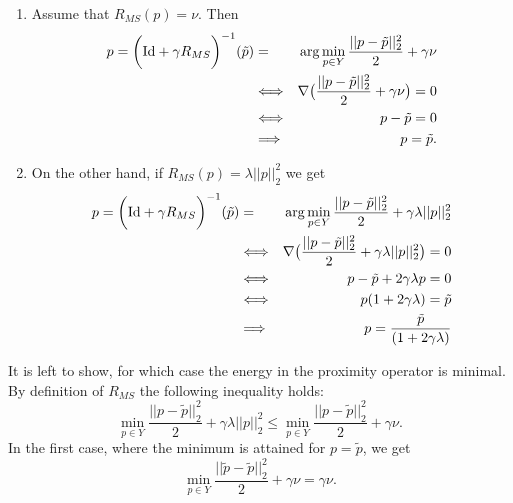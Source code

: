         \begin{enumerate}
            \item Assume that $R_{MS}(p) = \nu$. Then
                \begin{eqnarray}
                    p = \bigg( \textnormal{Id} + \gamma R_{MS} \bigg)^{-1}(\tilde{p}) &=& \arg \min_{p \in Y} \frac{||p - \tilde{p}||_{2}^{2}}{2} + \gamma\nu \notag \\
                    &\Longleftrightarrow& \nabla \big( \frac{||p - \tilde{p}||_{2}^{2}}{2} + \gamma\nu \big) = 0 \notag \\
                    &\Longleftrightarrow& p - \tilde{p} = 0 \notag \\
                    &\Longrightarrow& p = \tilde{p}. \notag
                \end{eqnarray}
            \item On the other hand, if $R_{MS}(p) = \lambda ||p||_{2}^{2}$ we get
                \begin{eqnarray}
                    p = \bigg( \textnormal{Id} + \gamma R_{MS} \bigg)^{-1}(\tilde{p}) &=& \arg \min_{p \in Y} \frac{||p - \tilde{p}||_{2}^{2}}{2} + \gamma \lambda ||p||_{2}^{2} \notag \\
                    &\Longleftrightarrow& \nabla \big( \frac{||p - \tilde{p}||_{2}^{2}}{2} + \gamma \lambda ||p||_{2}^{2} \big) = 0 \notag \\
                    &\Longleftrightarrow& p - \tilde{p} + 2 \gamma \lambda p = 0 \notag \\
                    &\Longleftrightarrow& p (1 + 2\gamma \lambda) = \tilde{p} \notag \\
                    &\Longrightarrow& p = \frac{\tilde{p}}{(1 + 2\gamma \lambda)} \notag
                \end{eqnarray}
        \end{enumerate}
        It is left to show, for which case the energy in the proximity operator is minimal. By definition of  $R_{MS}$ the following inequality holds:
            \begin{equation}
                \min_{p \in Y} \frac{||p - \tilde{p}||_{2}^{2}}{2} + \gamma \lambda ||p||_{2}^{2} \le \min_{p \in Y} \frac{||p - \tilde{p}||_{2}^{2}}{2} + \gamma\nu.
                \label{eq:minimal_energy}
            \end{equation}
        In the first case, where the minimum is attained for $p = \tilde{p}$, we get
            $$
                \min_{p \in Y} \frac{||\tilde{p} - \tilde{p}||_{2}^{2}}{2} + \gamma\nu = \gamma \nu.
            $$
